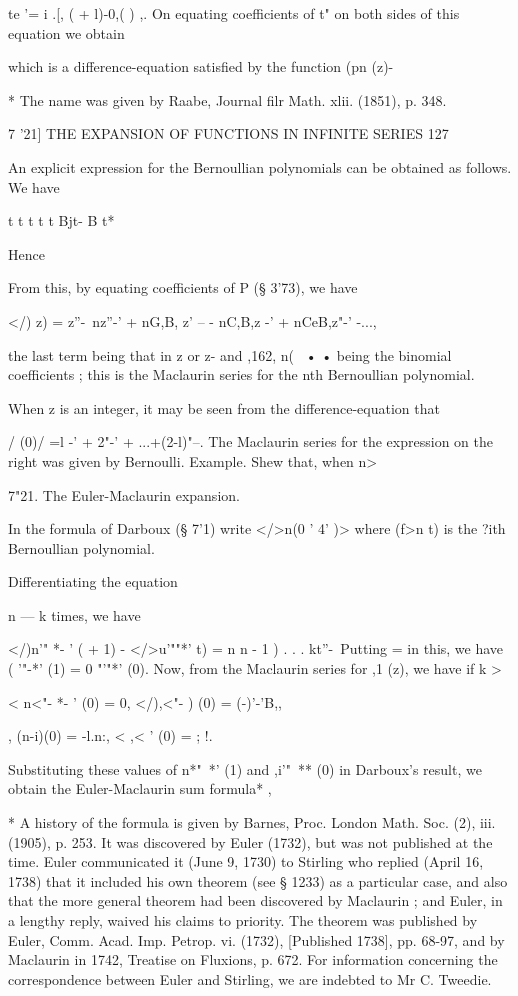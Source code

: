 te '= i .[, ( + l)-0,( ) ,. On equating coefficients of t" on both
sides of this equation we obtain

which is a difference-equation satisfied by the function (pn (z)-

* The name was given by Raabe, Journal filr Math. xlii. (1851), p.
348.



7 '21] THE EXPANSION OF FUNCTIONS IN INFINITE SERIES 127

An explicit expression for the Bernoullian polynomials can be obtained
as follows. We have

t t t t t Bjt- B t*

Hence

From this, by equating coefficients of P (§ 3'73), we have

</) z) = z''-\ nz''-' + nG,B, z' -- - nC,B,z -' + nCeB,z"-' -...,

the last term being that in z or z- and ,162, n( \, • • being the
binomial coefficients ; this is the Maclaurin series for the nth
Bernoullian polynomial.

When z is an integer, it may be seen from the difference-equation that

 / (0)/ =l -' + 2"-' + ...+(2-l)"--. The Maclaurin series for the
expression on the right was given by Bernoulli. Example. Shew that,
when n>\,

7"21. The Euler-Maclaurin expansion.

In the formula of Darboux (§ 7'1) write </>n(0 ' 4' )> where (f>n t)
is the ?ith Bernoullian polynomial.

Differentiating the equation

n — k times, we have

</)n'" *- ' ( + 1) - </>u'""*' t) = n n - 1 ) . . . kt''-\ Putting =
in this, we have ( '"-*' (1) = 0 "'"*' (0). Now, from the Maclaurin
series for ,1 (z), we have if k >

< n<"- *- ' (0) = 0, </),<"- ) (0) = (-)'-'B,,

 , (n-i)(0) = -l.n:, < ,< ' (0) = ; !.

Substituting these values of n*"~*' (1) and ,i'"~** (0) in Darboux's
result, we obtain the Euler-Maclaurin sum formula* ,

* A history of the formula is given by Barnes, Proc. London Math. Soc.
(2), iii. (1905), p. 253. It was discovered by Euler (1732), but was
not published at the time. Euler communicated it (June 9, 1730) to
Stirling who replied (April 16, 1738) that it included his own theorem
(see § 1233) as a particular case, and also that the more general
theorem had been discovered by Maclaurin ; and Euler, in a lengthy
reply, waived his claims to priority. The theorem was published by
Euler, Comm. Acad. Imp. Petrop. vi. (1732), [Published 1738], pp.
68-97, and by Maclaurin in 1742, Treatise on Fluxions, p. 672. For
information concerning the correspondence between Euler and Stirling,
we are indebted to Mr C. Tweedie.



